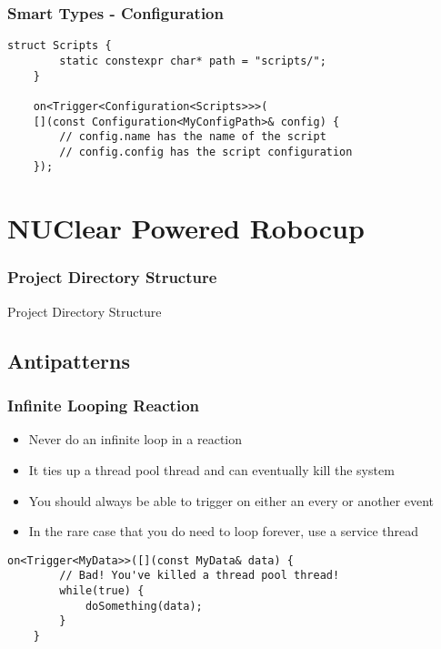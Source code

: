 \documentclass{beamer}
\begin{document}
\begin{frame}[fragile]
	\frametitle{Smart Types - Configuration}
	\begin{lstlisting}[language=nuclear]
	struct Scripts {
		static constexpr char* path = "scripts/";
	}
	
	on<Trigger<Configuration<Scripts>>>(
	[](const Configuration<MyConfigPath>& config) {
		// config.name has the name of the script
		// config.config has the script configuration
	});
	\end{lstlisting}
\end{frame}

\section{NUClear Powered Robocup}
\begin{frame}
	\frametitle{Project Directory Structure}
	Project Directory Structure
\end{frame}

\subsection{Antipatterns}
\begin{frame}[fragile]
	\frametitle{Infinite Looping Reaction}

	\begin{itemize}
		\item Never do an infinite loop in a reaction
		\item It ties up a thread pool thread and can eventually kill the system
		\item You should always be able to trigger on either an every or another event
		\item In the rare case that you do need to loop forever, use a service thread
	\end{itemize}

	\begin{lstlisting}[language=nuclear]
	on<Trigger<MyData>>([](const MyData& data) {
		// Bad! You've killed a thread pool thread!
		while(true) {
			doSomething(data);
		}
	}
	\end{lstlisting}
\end{frame}
\end{document}
